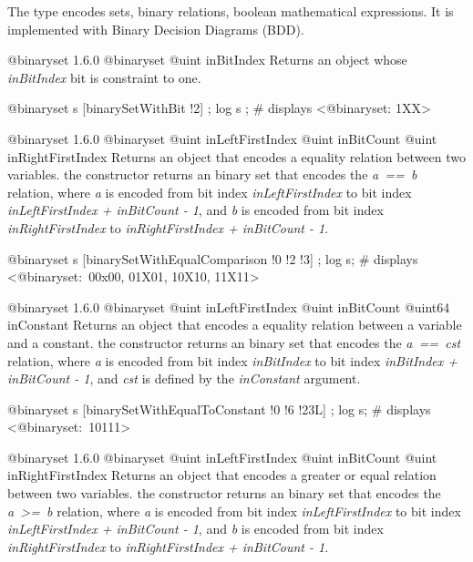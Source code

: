

The  type encodes sets, binary relations, boolean mathematical expressions. It is implemented with Binary Decision Diagrams (BDD).




{@binaryset}
{1.6.0}
{@binaryset}
{@uint inBitIndex}
{Returns an  object whose \emph{inBitIndex} bit is constraint to one.}
{}

\exempleDeuxLignes
{}
{@binaryset s [binarySetWithBit !2] ;}
{log s ; \# displays <@binaryset: 1XX>}





{@binaryset}
{1.6.0}
{@binaryset}
{@uint inLeftFirstIndex}
{@uint inBitCount}
{@uint inRightFirstIndex}
{Returns an  object that encodes a equality relation between two variables.}
{the constructor returns an binary set that encodes the \emph{a~==~b} relation, where \emph{a} is encoded from bit index \emph{inLeftFirstIndex} to bit index \emph{inLeftFirstIndex  + inBitCount - 1}, and \emph{b} is encoded from bit index \emph{inRightFirstIndex} to \emph{inRightFirstIndex + inBitCount - 1}.}

\exempleDeuxLignes
{}
{@binaryset s [binarySetWithEqualComparison !0 !2 !3] ;}
{log s; \# displays <@binaryset:~00x00, 01X01, 10X10, 11X11>}





{@binaryset}
{1.6.0}
{@binaryset}
{@uint inLeftFirstIndex}
{@uint inBitCount}
{@uint64 inConstant}
{Returns an  object that encodes a equality relation between a variable and a constant.}
{the constructor returns an binary set that encodes the \emph{a~==~cst} relation, where \emph {a} is encoded from bit index \emph{inBitIndex} to bit index \emph{inBitIndex  + inBitCount - 1}, and \emph{cst} is defined by the \emph{inConstant} argument.}

\exempleDeuxLignes
{}
{@binaryset s [binarySetWithEqualToConstant !0 !6 !23L] ;}
{log s; \# displays <@binaryset:~10111>}





{@binaryset}
{1.6.0}
{@binaryset}
{@uint inLeftFirstIndex}
{@uint inBitCount}
{@uint inRightFirstIndex}
{Returns an  object that encodes a greater or equal relation between two variables.}
{the constructor returns an binary set that encodes the \emph{a~>=~b} relation, where \emph{a} is encoded from bit index \emph{inLeftFirstIndex} to bit index \emph{inLeftFirstIndex  + inBitCount - 1}, and \emph{b} is encoded from bit index \emph{inRightFirstIndex} to \emph{inRightFirstIndex + inBitCount - 1}.}

